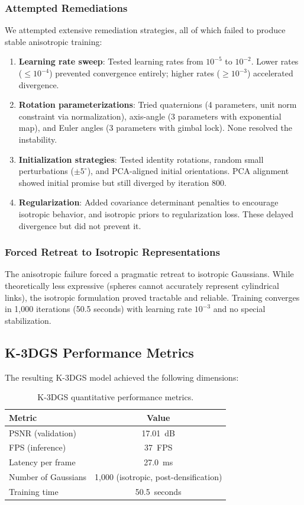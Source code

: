\documentclass[12pt,a4paper,oneside]{report}
\begin{document}
\subsubsection{Attempted Remediations}
We attempted extensive remediation strategies, all of which failed to produce stable anisotropic training:
\begin{enumerate}
    \item \textbf{Learning rate sweep}: Tested learning rates from $10^{-5}$ to $10^{-2}$. Lower rates ($\leq 10^{-4}$) prevented convergence entirely; higher rates ($\geq 10^{-3}$) accelerated divergence.
    \item \textbf{Rotation parameterizations}: Tried quaternions (4 parameters, unit norm constraint via normalization), axis-angle (3 parameters with exponential map), and Euler angles (3 parameters with gimbal lock). None resolved the instability.
    \item \textbf{Initialization strategies}: Tested identity rotations, random small perturbations ($\pm5^\circ$), and PCA-aligned initial orientations. PCA alignment showed initial promise but still diverged by iteration 800.
    \item \textbf{Regularization}: Added covariance determinant penalties to encourage isotropic behavior, and isotropic priors to regularization loss. These delayed divergence but did not prevent it.
\end{enumerate}

\subsubsection{Forced Retreat to Isotropic Representations}
The anisotropic failure forced a pragmatic retreat to isotropic Gaussians. While theoretically less expressive (spheres cannot accurately represent cylindrical links), the isotropic formulation proved tractable and reliable. Training converges in 1,000 iterations (50.5 seconds) with learning rate $10^{-3}$ and no special stabilization.

\subsection{K-3DGS Performance Metrics}
The resulting K-3DGS model achieved the following dimensions:
\begin{table}[H]
\centering
\caption{K-3DGS quantitative performance metrics.}
\label{tab:k3dgs_performance}
\begin{tabular}{lc}
\toprule
Metric & Value \\
\midrule
PSNR (validation) & 17.01~dB \\
FPS (inference) & 37~FPS \\
Latency per frame & 27.0~ms \\
Number of Gaussians & 1,000 (isotropic, post-densification) \\
Training time & 50.5~seconds \\
\bottomrule
\end{tabular}
\end{table}
\end{document}
